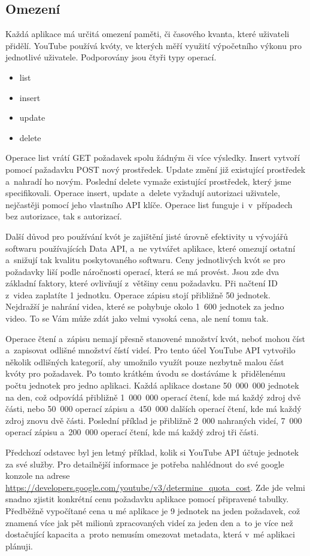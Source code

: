 \subsection{Omezení}
\par Každá aplikace má určitá omezení paměti\cite{quota}\cite{googleconsole}, či časového kvanta, které uživateli přidělí. YouTube používá kvóty, ve kterých měří využití výpočetního výkonu pro jednotlivé uživatele. Podporovány jsou čtyři typy operací.
\begin{itemize}
\item {list}
\item {insert}
\item {update}
\item {delete}
\end{itemize}
\par Operace list vrátí GET požadavek spolu žádným či více výsledky. Insert vytvoří pomocí pažadavku POST nový prostředek. Update změní již existující prostředek a~nahradí ho novým. Poslední delete vymaže existující prostředek, který jsme specifikovali. Operace insert, update a~delete vyžadují autorizaci uživatele, nejčastěji pomocí jeho vlastního API\cite{apistart} klíče. Operace list funguje i~v~případech bez autorizace, tak s autorizací.
\par Další důvod pro používání kvót je zajištění jisté úrovně efektivity u vývojářů softwaru používajících Data API, a~ne vytvářet aplikace, které omezují ostatní a~snižují tak kvalitu poskytovaného softwaru. Ceny jednotlivých kvót se pro požadavky liší podle náročnosti operací, která se má provést. Jsou zde dva základní faktory, které ovlivňují z~většiny cenu požadavku. Při načtení ID z~videa zaplatíte 1 jednotku. Operace zápisu stojí přibližně 50 jednotek. Nejdražší je nahrání videa, které se pohybuje okolo 1~600 jednotek za jedno video. To se Vám může zdát jako velmi vysoká cena, ale není tomu tak. 
\par Operace čtení a~zápisu nemají přesně stanovené množství kvót, neboť mohou číst a~zapisovat odlišné množství čístí videí. Pro tento účel YouTube API vytvořilo několik odlišných kategorií, aby umožnilo využít pouze nezbytně malou část kvóty pro požadavek. Po tomto krátkém úvodu se dostáváme k~přidělenému počtu jednotek pro jedno aplikaci. Každá aplikace dostane 50~000~000 jednotek na den, což odpovídá přibližně 1~000~000 operací čtení, kde má každý zdroj dvě části, nebo 50~000 operací zápisu a~450~000 dalších operací čtení, kde má každý zdroj znovu dvě části. Poslední příklad je přibližně 2~000 nahraných videí, 7~000 operací zápisu a~200~000 operací čtení, kde má každý zdroj tři části.
\par Předchozí odstavec byl jen letmý příklad, kolik si YouTube API účtuje jednotek za své služby. Pro detailnější informace je potřeba nahlédnout do své google konzole na adrese \url{https://developers.google.com/youtube/v3/determine_quota_cost}\cite{quota}. Zde jde velmi snadno zjistit konkrétní cenu požadavku aplikace pomocí připravené tabulky. Předběžně vypočítané cena u mé aplikace je 9 jednotek na jeden požadavek, což znamená více jak pět milionů zpracovaných videí za jeden den a~to je více než dostačující kapacita a~proto nemusím omezovat metadata, která v~mé aplikaci plánuji. 
